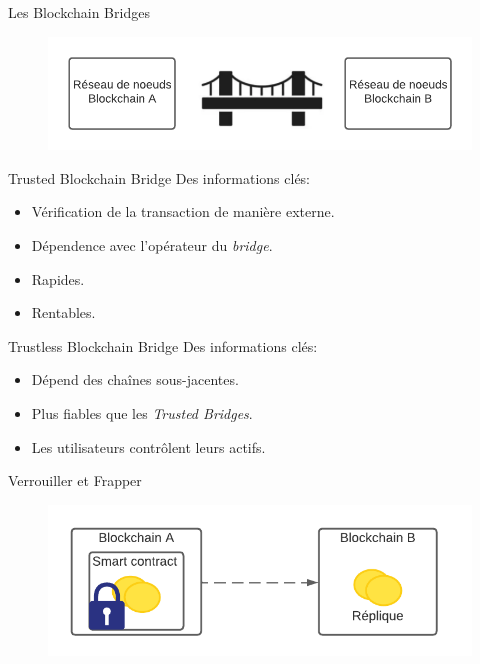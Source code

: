 \begin{frame}{Les Blockchain Bridges}
    \begin{figure}
        \centering
        \includegraphics[scale = 1]{centralisation/img_bridges/Pont.png}
    \end{figure}
\end{frame}

\begin{frame}{Trusted Blockchain Bridge}
    Des informations clés: 
        \begin{itemize}
            \item Vérification de la transaction de manière externe.
            \item Dépendence avec l'opérateur du \textit{bridge}.
            \item Rapides.
            \item Rentables.
        \end{itemize}
    \end{frame}
    
    \begin{frame}{Trustless Blockchain Bridge}
    Des informations clés: 
    \begin{itemize}
        \item Dépend des chaînes sous-jacentes.
        \item Plus fiables que les \textit{Trusted Bridges}.
        \item Les utilisateurs contrôlent leurs actifs.
    \end{itemize}
    \end{frame}

\begin{frame}{Verrouiller et Frapper}
    \begin{figure}
        \centering
        \includegraphics[scale = 1]{centralisation/img_bridges/LockAndMint.png}
    \end{figure}
\end{frame}

